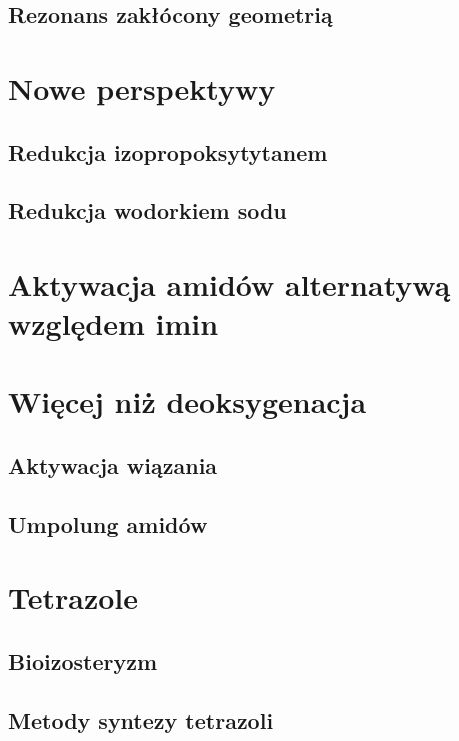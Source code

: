 \subsection{Rezonans zakłócony geometrią}

\section{Nowe perspektywy}
\subsection{Redukcja izopropoksytytanem}
\subsection{Redukcja wodorkiem sodu}

\section{Aktywacja amidów alternatywą względem imin}

\section{Więcej niż deoksygenacja}
\subsection{Aktywacja wiązania }
\subsection{Umpolung amidów}

\section{Tetrazole}
\subsection{Bioizosteryzm}
\subsection{Metody syntezy tetrazoli}
